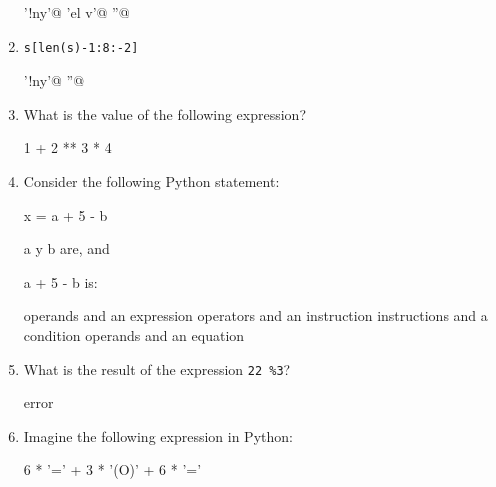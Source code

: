 \begin{enumerate}
\begin{choices}
    \choice \verb@'!ny'@
    \choice \verb@'el v'@
    \choice \verb@''@
    \choice \verb@IndexError@
\end{choices}


\item 
\begin{Verbatim}
s[len(s)-1:8:-2]
\end{Verbatim}

\begin{choices}
    \choice \verb@'!ny'@
    \choice \verb@''@
    \choice \verb@TypeError@
    \choice \verb@IndexError@
\end{choices}


\item What is the value of the following expression?

1 + 2 ** 3 * 4

\begin{choices}
\end{choices}


\item Consider the following Python statement:

\begin{python}
x = a + 5 - b
\end{python}

a y b are, and 


a + 5 - b is: 

\begin{choices}
    \choice operands and an expression %
    \choice operators and an instruction
    \choice instructions and a condition
    \choice operands and an equation
\end{choices}

\item What is the result of the expression \texttt{22\ \%3}?

\begin{choices}
    \choice error
\end{choices}

\item Imagine the following expression in Python:

\begin{python}
6 * '=' + 3 * '(O)' + 6 * '='
\end{python}


\end{enumerate}
